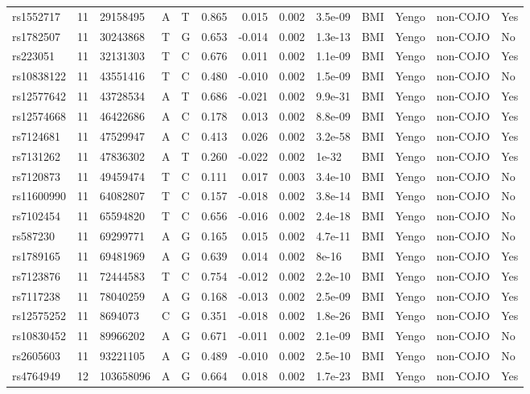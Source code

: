 \documentclass[11pt,twoside]{bristolthesis}
\begin{document}
\begin{longtable}[t]{lrlllrrrlllll}
\addlinespace
rs1552717 & 11 & 29158495 & A & T & 0.865 & 0.015 & 0.002 & 3.5e-09 & BMI & Yengo & non-COJO & Yes\\
rs1782507 & 11 & 30243868 & T & G & 0.653 & -0.014 & 0.002 & 1.3e-13 & BMI & Yengo & non-COJO & No\\
rs223051 & 11 & 32131303 & T & C & 0.676 & 0.011 & 0.002 & 1.1e-09 & BMI & Yengo & non-COJO & Yes\\
rs10838122 & 11 & 43551416 & T & C & 0.480 & -0.010 & 0.002 & 1.5e-09 & BMI & Yengo & non-COJO & No\\
rs12577642 & 11 & 43728534 & A & T & 0.686 & -0.021 & 0.002 & 9.9e-31 & BMI & Yengo & non-COJO & Yes\\
\addlinespace
rs12574668 & 11 & 46422686 & A & C & 0.178 & 0.013 & 0.002 & 8.8e-09 & BMI & Yengo & non-COJO & Yes\\
rs7124681 & 11 & 47529947 & A & C & 0.413 & 0.026 & 0.002 & 3.2e-58 & BMI & Yengo & non-COJO & Yes\\
rs7131262 & 11 & 47836302 & A & T & 0.260 & -0.022 & 0.002 & 1e-32 & BMI & Yengo & non-COJO & Yes\\
rs7120873 & 11 & 49459474 & T & C & 0.111 & 0.017 & 0.003 & 3.4e-10 & BMI & Yengo & non-COJO & No\\
rs11600990 & 11 & 64082807 & T & C & 0.157 & -0.018 & 0.002 & 3.8e-14 & BMI & Yengo & non-COJO & No\\
\addlinespace
rs7102454 & 11 & 65594820 & T & C & 0.656 & -0.016 & 0.002 & 2.4e-18 & BMI & Yengo & non-COJO & No\\
rs587230 & 11 & 69299771 & A & G & 0.165 & 0.015 & 0.002 & 4.7e-11 & BMI & Yengo & non-COJO & No\\
rs1789165 & 11 & 69481969 & A & G & 0.639 & 0.014 & 0.002 & 8e-16 & BMI & Yengo & non-COJO & Yes\\
rs7123876 & 11 & 72444583 & T & C & 0.754 & -0.012 & 0.002 & 2.2e-10 & BMI & Yengo & non-COJO & Yes\\
rs7117238 & 11 & 78040259 & A & G & 0.168 & -0.013 & 0.002 & 2.5e-09 & BMI & Yengo & non-COJO & Yes\\
\addlinespace
rs12575252 & 11 & 8694073 & C & G & 0.351 & -0.018 & 0.002 & 1.8e-26 & BMI & Yengo & non-COJO & Yes\\
rs10830452 & 11 & 89966202 & A & G & 0.671 & -0.011 & 0.002 & 2.1e-09 & BMI & Yengo & non-COJO & No\\
rs2605603 & 11 & 93221105 & A & G & 0.489 & -0.010 & 0.002 & 2.5e-10 & BMI & Yengo & non-COJO & No\\
rs4764949 & 12 & 103658096 & A & G & 0.664 & 0.018 & 0.002 & 1.7e-23 & BMI & Yengo & non-COJO & Yes\\

\end{longtable}
\end{document}
